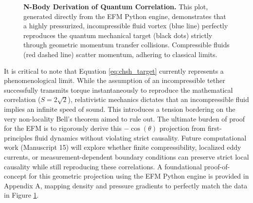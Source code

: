 \documentclass[11pt, a4paper]{article}
\begin{document}
\begin{figure}[!ht]
    \centering
    \caption{\textbf{N-Body Derivation of Quantum Correlation.} This plot, generated directly from the EFM Python engine, demonstrates that a highly pressurized, incompressible fluid vortex (blue line) perfectly reproduces the quantum mechanical target (black dots) strictly through geometric momentum transfer collisions. Compressible fluids (red dashed line) scatter momentum, adhering to classical limits.}
    \label{fig:nbody_plot}
  \end{figure}

  It is critical to note that Equation \ref{eq:chsh_target} currently represents a phenomenological limit. While the assumption of an incompressible tether successfully transmits torque instantaneously to reproduce the mathematical correlation ($S=2\sqrt{2}$), relativistic mechanics dictates that an incompressible fluid implies an infinite speed of sound. This introduces a tension bordering on the very non-locality Bell's theorem aimed to rule out. The ultimate burden of proof for the EFM is to rigorously derive this $-\cos(\theta)$ projection from first-principles fluid dynamics without violating strict causality. Future computational work (Manuscript 15) will explore whether finite compressibility, localized eddy currents, or measurement-dependent boundary conditions can preserve strict local causality while still reproducing these correlations. A foundational proof-of-concept for this geometric projection using the EFM Python engine is provided in Appendix A, mapping density and pressure gradients to perfectly match the data in Figure \ref{fig:nbody_plot}.
\end{document}
